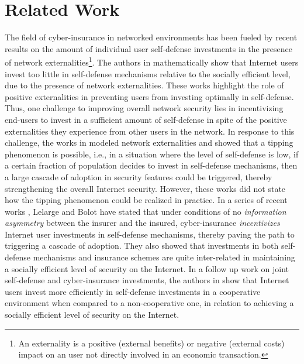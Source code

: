 \documentclass[letterpaper,12pt, onecolumn, nodraft]{IEEEtran}
\begin{document}
\section{Related Work}	\label{sec-related}
The field of cyber-insurance in networked environments has been fueled
by recent results on the amount of individual user self-defense investments
in the presence of network externalities\footnote{
	An externality  is a positive (external benefits) or negative (external costs) impact on an user not directly involved in an economic transaction.}.
The authors in \cite{gccr}\cite{jaw}\cite{leb5}\cite{leb4}\cite{mybm}\cite{oom} mathematically show
that Internet users invest too little in self-defense mechanisms relative
to the socially efficient level, due to the presence of network externalities.
These works highlight the role of positive externalities in preventing
users from investing optimally in self-defense. Thus, one challenge to
improving overall network security lies in incentivizing end-users to
invest in a sufficient amount of self-defense in spite of the
positive externalities they experience from other users in the network.
In response to this challenge, the works in \cite{leb5}\cite{leb4} modeled
network externalities and showed that a tipping phenomenon is possible,
i.e., in a situation where the level of self-defense is low, if a certain
fraction of population decides to invest in self-defense mechanisms,
then a large cascade of adoption in security features could be triggered,
thereby strengthening the overall Internet security. However, these
works did not state how the tipping phenomenon could be realized in
practice. In a series of recent works \cite{leb3}\cite{leb}, Lelarge and Bolot
have stated that under conditions of
no \emph{information asymmetry} \cite{wik}\cite{hv} between the insurer and
the insured, cyber-insurance \emph{incentivizes} Internet user investments
in self-defense mechanisms, thereby paving the path to triggering a cascade
of adoption. They also showed that investments in both self-defense mechanisms
and insurance schemes are quite inter-related in maintaining a socially
efficient level of security on the Internet. In a follow up work on joint self-defense and cyber-insurance investments, the authors in \cite{pg} show that Internet users invest more efficiently in self-defense investments in a cooperative environment when compared to a non-cooperative one, in relation to achieving a socially efficient level of security on the Internet. 
\end{document}
